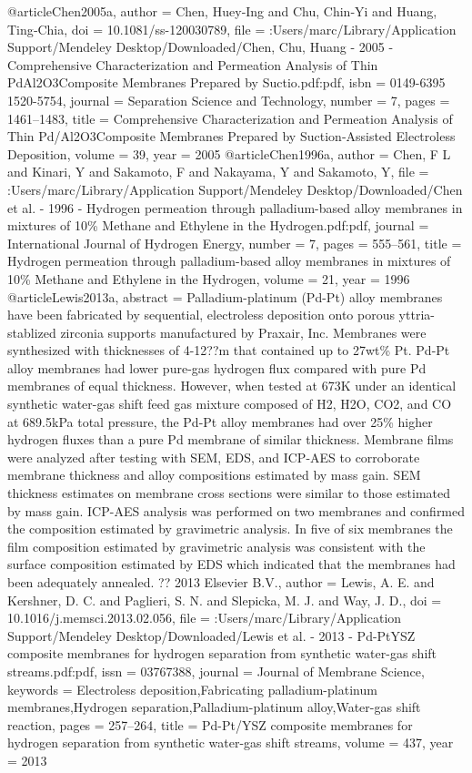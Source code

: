 @article{Chen2005a,
author = {Chen, Huey‐Ing and Chu, Chin‐Yi and Huang, Ting‐Chia},
doi = {10.1081/ss-120030789},
file = {:Users/marc/Library/Application Support/Mendeley Desktop/Downloaded/Chen, Chu, Huang - 2005 - Comprehensive Characterization and Permeation Analysis of Thin PdAl2O3Composite Membranes Prepared by Suctio.pdf:pdf},
isbn = {0149-6395
1520-5754},
journal = {Separation Science and Technology},
number = {7},
pages = {1461--1483},
title = {{Comprehensive Characterization and Permeation Analysis of Thin Pd/Al2O3Composite Membranes Prepared by Suction‐Assisted Electroless Deposition}},
volume = {39},
year = {2005}
}
@article{Chen1996a,
author = {Chen, F L and Kinari, Y and Sakamoto, F and Nakayama, Y and Sakamoto, Y},
file = {:Users/marc/Library/Application Support/Mendeley Desktop/Downloaded/Chen et al. - 1996 - Hydrogen permeation through palladium-based alloy membranes in mixtures of 10{\%} Methane and Ethylene in the Hydrogen.pdf:pdf},
journal = {International Journal of Hydrogen Energy},
number = {7},
pages = {555--561},
title = {{Hydrogen permeation through palladium-based alloy membranes in mixtures of 10{\%} Methane and Ethylene in the Hydrogen}},
volume = {21},
year = {1996}
}
@article{Lewis2013a,
abstract = {Palladium-platinum (Pd-Pt) alloy membranes have been fabricated by sequential, electroless deposition onto porous yttria-stablized zirconia supports manufactured by Praxair, Inc. Membranes were synthesized with thicknesses of 4-12??m that contained up to 27wt{\%} Pt. Pd-Pt alloy membranes had lower pure-gas hydrogen flux compared with pure Pd membranes of equal thickness. However, when tested at 673K under an identical synthetic water-gas shift feed gas mixture composed of H2, H2O, CO2, and CO at 689.5kPa total pressure, the Pd-Pt alloy membranes had over 25{\%} higher hydrogen fluxes than a pure Pd membrane of similar thickness. Membrane films were analyzed after testing with SEM, EDS, and ICP-AES to corroborate membrane thickness and alloy compositions estimated by mass gain. SEM thickness estimates on membrane cross sections were similar to those estimated by mass gain. ICP-AES analysis was performed on two membranes and confirmed the composition estimated by gravimetric analysis. In five of six membranes the film composition estimated by gravimetric analysis was consistent with the surface composition estimated by EDS which indicated that the membranes had been adequately annealed. ?? 2013 Elsevier B.V.},
author = {Lewis, A. E. and Kershner, D. C. and Paglieri, S. N. and Slepicka, M. J. and Way, J. D.},
doi = {10.1016/j.memsci.2013.02.056},
file = {:Users/marc/Library/Application Support/Mendeley Desktop/Downloaded/Lewis et al. - 2013 - Pd-PtYSZ composite membranes for hydrogen separation from synthetic water-gas shift streams.pdf:pdf},
issn = {03767388},
journal = {Journal of Membrane Science},
keywords = {Electroless deposition,Fabricating palladium-platinum membranes,Hydrogen separation,Palladium-platinum alloy,Water-gas shift reaction},
pages = {257--264},
title = {{Pd-Pt/YSZ composite membranes for hydrogen separation from synthetic water-gas shift streams}},
volume = {437},
year = {2013}
}
